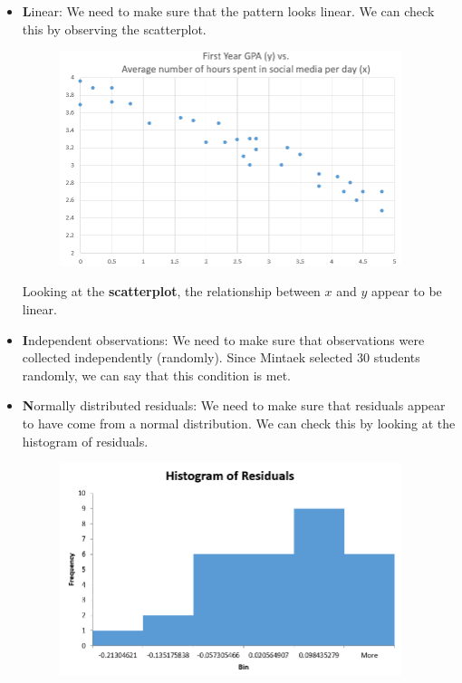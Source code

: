 \documentclass[12pt]{article}
\begin{document}
\begin{itemize}
	\item \textbf{L}inear: We need to make sure that the pattern looks linear. We can check this by observing the scatterplot.
	
	\begin{figure}[!h]
		\centering
		\vspace{-10 pt}
		\includegraphics[width=10cm]{Figures/fig9.png}
		\vspace{-10 pt}
	\end{figure}

	Looking at the \textbf{scatterplot}, the relationship between $x$ and $y$ appear to be linear.
	
	\item \textbf{I}ndependent observations: We need to make sure that observations were collected independently (randomly). Since Mintaek selected 30 students randomly, we can say that this condition is met.
	
	\item \textbf{N}ormally distributed residuals: We need to make sure that residuals appear to have come from a normal distribution. We can check this by looking at the histogram of residuals.
	
	\begin{figure}[!h]
		\centering
		\vspace{-10 pt}
		\includegraphics[width=10cm]{Figures/fig10.png}
		\vspace{-10 pt}
	\end{figure}
	

\end{itemize}
\end{document}
